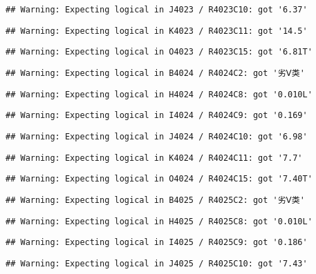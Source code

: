 \documentclass[
]{article}
\begin{document}
\begin{verbatim}
## Warning: Expecting logical in J4023 / R4023C10: got '6.37'
\end{verbatim}

\begin{verbatim}
## Warning: Expecting logical in K4023 / R4023C11: got '14.5'
\end{verbatim}

\begin{verbatim}
## Warning: Expecting logical in O4023 / R4023C15: got '6.81T'
\end{verbatim}

\begin{verbatim}
## Warning: Expecting logical in B4024 / R4024C2: got '劣Ⅴ类'
\end{verbatim}

\begin{verbatim}
## Warning: Expecting logical in H4024 / R4024C8: got '0.010L'
\end{verbatim}

\begin{verbatim}
## Warning: Expecting logical in I4024 / R4024C9: got '0.169'
\end{verbatim}

\begin{verbatim}
## Warning: Expecting logical in J4024 / R4024C10: got '6.98'
\end{verbatim}

\begin{verbatim}
## Warning: Expecting logical in K4024 / R4024C11: got '7.7'
\end{verbatim}

\begin{verbatim}
## Warning: Expecting logical in O4024 / R4024C15: got '7.40T'
\end{verbatim}

\begin{verbatim}
## Warning: Expecting logical in B4025 / R4025C2: got '劣Ⅴ类'
\end{verbatim}

\begin{verbatim}
## Warning: Expecting logical in H4025 / R4025C8: got '0.010L'
\end{verbatim}

\begin{verbatim}
## Warning: Expecting logical in I4025 / R4025C9: got '0.186'
\end{verbatim}

\begin{verbatim}
## Warning: Expecting logical in J4025 / R4025C10: got '7.43'
\end{verbatim}
\end{document}
